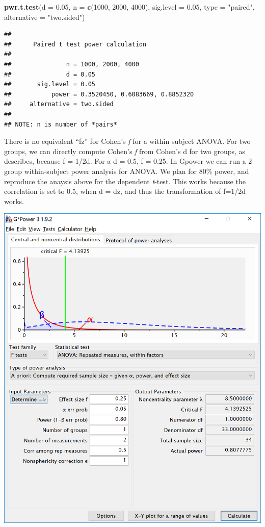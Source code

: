 \documentclass[
]{book}
\newenvironment{Shaded}{\begin{snugshade}}{\end{snugshade}}
\newcommand{\DataTypeTok}[1]{\textcolor[rgb]{0.13,0.29,0.53}{#1}}
\newcommand{\DecValTok}[1]{\textcolor[rgb]{0.00,0.00,0.81}{#1}}
\newcommand{\FloatTok}[1]{\textcolor[rgb]{0.00,0.00,0.81}{#1}}
\newcommand{\KeywordTok}[1]{\textcolor[rgb]{0.13,0.29,0.53}{\textbf{#1}}}
\newcommand{\NormalTok}[1]{#1}
\newcommand{\StringTok}[1]{\textcolor[rgb]{0.31,0.60,0.02}{#1}}
\begin{document}
\begin{Shaded}
\begin{Highlighting}[]
\KeywordTok{pwr.t.test}\NormalTok{(}\DataTypeTok{d =} \FloatTok{0.05}\NormalTok{,}
           \DataTypeTok{n =} \KeywordTok{c}\NormalTok{(}\DecValTok{1000}\NormalTok{, }\DecValTok{2000}\NormalTok{, }\DecValTok{4000}\NormalTok{),}
           \DataTypeTok{sig.level =} \FloatTok{0.05}\NormalTok{,}
           \DataTypeTok{type =} \StringTok{"paired"}\NormalTok{,}
           \DataTypeTok{alternative =} \StringTok{"two.sided"}\NormalTok{)}
\end{Highlighting}
\end{Shaded}

\begin{verbatim}
## 
##      Paired t test power calculation 
## 
##               n = 1000, 2000, 4000
##               d = 0.05
##       sig.level = 0.05
##           power = 0.3520450, 0.6083669, 0.8852320
##     alternative = two.sided
## 
## NOTE: n is number of *pairs*
\end{verbatim}

\newpage

There is no equivalent ``fz'' for Cohen's \emph{f} for a within subject ANOVA. For two groups, we can directly compute Cohen's \emph{f} from Cohen's d for two groups, as \citet{cohen1988spa} describes, because f = 1/2d. For a d = 0.5, f = 0.25. In Gpower we can run a 2 group within-subject power analysis for ANOVA. We plan for 80\% power, and reproduce the anaysis above for the dependent \emph{t}-test. This works because the correlation is set to 0.5, when d = dz, and thus the transformation of f=1/2d works.

\includegraphics{screenshots/gpower_1.png}
\end{document}
